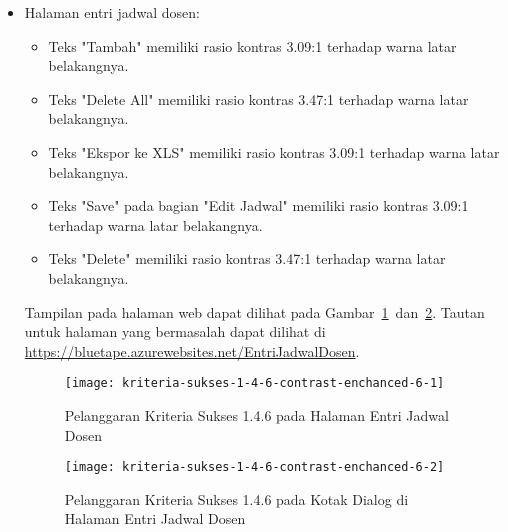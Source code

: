 \begin{itemize}
    \item Halaman entri jadwal dosen: 
    \begin{itemize}
        \item Teks "Tambah" memiliki rasio kontras 3.09:1 terhadap warna latar belakangnya.
        \item Teks "Delete All" memiliki rasio kontras 3.47:1 terhadap warna latar belakangnya.
        \item Teks "Ekspor ke XLS" memiliki rasio kontras 3.09:1 terhadap warna latar belakangnya.
        \item Teks "Save" pada bagian "Edit Jadwal" memiliki rasio kontras 3.09:1 terhadap warna latar belakangnya.
        \item Teks "Delete" memiliki rasio kontras 3.47:1 terhadap warna latar belakangnya.
    \end{itemize}
    Tampilan pada halaman web dapat dilihat pada \mbox{Gambar \ref{fig:1.4.6_contrast_enchanced_6_1} dan \ref{fig:1.4.6_contrast_enchanced_6_2}}. Tautan untuk halaman yang bermasalah dapat dilihat di \url{https://bluetape.azurewebsites.net/EntriJadwalDosen}.
    \begin{figure}[H]
        \centering  
        \texttt{[image: kriteria-sukses-1-4-6-contrast-enchanced-6-1]}  
        \caption[Pelanggaran Kriteria Sukses 1.4.6 pada Halaman Entri Jadwal Dosen]{Pelanggaran Kriteria Sukses 1.4.6 pada Halaman Entri Jadwal Dosen}
        \label{fig:1.4.6_contrast_enchanced_6_1}  
    \end{figure} 
    
    \begin{figure}[H]
        \centering  
        \texttt{[image: kriteria-sukses-1-4-6-contrast-enchanced-6-2]}  
        \caption[Pelanggaran Kriteria Sukses 1.4.6 pada Kotak Dialog di Halaman Entri Jadwal Dosen]{Pelanggaran Kriteria Sukses 1.4.6 pada Kotak Dialog di Halaman Entri Jadwal Dosen}
        \label{fig:1.4.6_contrast_enchanced_6_2}  
    \end{figure} 


\end{itemize}
